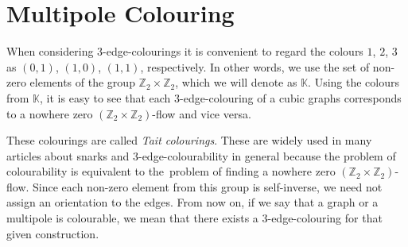 \section{Multipole Colouring}\label{sec:multipole-colouring}


When considering $3$-edge-colourings it is convenient to regard the colours $1$, $2$, $3$ as $(0, 1)$, $(1, 0)$, $(1,1)$, respectively. In other words, we use the set of non-zero elements of the group $\mathbb{Z}_2\times\mathbb{Z}_2$, which we will denote as $\mathbb{K}$. Using the colours from $\mathbb{K}$, it is easy to see that each $3$-edge-colouring of a cubic graphs corresponds to a nowhere zero $(\mathbb{Z}_2\times\mathbb{Z}_2)$-flow and vice versa.

	

These colourings are called \textit{Tait colourings}. These are widely used in many articles about snarks and 3-edge-colourability in general because the problem of colourability is equivalent to the~problem of finding a nowhere zero $(\mathbb{Z}_2\times\mathbb{Z}_2)$-flow. Since each non-zero element from this group is self-inverse, we need not assign an orientation to the edges. From now on, if we say that a graph or a multipole is colourable, we mean that there exists a 3-edge-colouring for that given construction.

